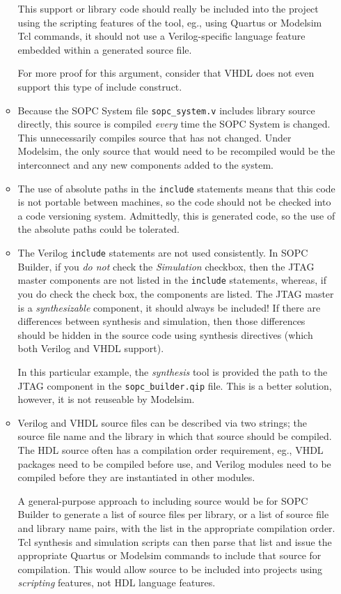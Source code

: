 \documentclass[10pt,twoside]{article}
\begin{document}
\begin{enumerate}
\begin{itemize}
This support or library code should really be included into the project
using the scripting features of the tool, eg., using Quartus or Modelsim
Tcl commands, it should not use a Verilog-specific language feature
embedded within a generated source file. 

For more proof for this argument, consider that VHDL does not even
support this type of include construct.
%
\item
Because the SOPC System file \verb+sopc_system.v+ includes library
source directly, this source is compiled {\em every} time the SOPC
System is changed. This unnecessarily compiles source that has not
changed. Under Modelsim, the only source that would need to be
recompiled would be the interconnect and any new components added
to the system.
%
\item
The use of absolute paths in the \verb+include+ statements means that 
this code is not portable between machines, so the code should not be
checked into a code versioning system. Admittedly, this is generated 
code, so the use of the absolute paths could be tolerated.
%
\item The Verilog \verb+include+ statements are not used
consistently. In SOPC Builder, if you {\em do not} check the
{\em Simulation} checkbox, then the JTAG master components are not
listed in the \verb+include+ statements, whereas, if you do check
the check box, the components are listed. The JTAG master is a
{\em synthesizable} component, it should always be included!
If there are differences between synthesis and simulation,
then those differences should be hidden in the source code using
synthesis directives (which both Verilog and VHDL support).

In this particular example, the {\em synthesis} tool is provided the
path to the JTAG component in the \verb+sopc_builder.qip+ file.
This is a better solution, however, it is not reuseable by 
Modelsim.

\item Verilog and VHDL source files can be described via two
strings; the source file name and the library in which that
source should be compiled. The HDL source often has a compilation
order requirement, eg., VHDL packages need to be compiled before
use, and Verilog modules need to be compiled before they are
instantiated in other modules.

A general-purpose approach to including source would be for
SOPC Builder to generate a list of source files per library, or
a list of source file and library name pairs, with the list
in the appropriate compilation order. Tcl synthesis and
simulation scripts can then parse that list and issue the
appropriate Quartus or Modelsim commands to include that
source for compilation. This would allow source to be
included into projects using {\em scripting} features, not HDL
language features.
%
\end{itemize}


\end{enumerate}
\end{document}
